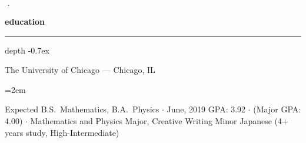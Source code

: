 \documentclass[12pt]{scrartcl}
\newcommand{\Description}[1]{\hangindent=2em\hangafter=0\noindent\raggedright\footnotesize{#1}\par\normalsize\vspace{0.5em}} %
\def\vhrulefill{\leavevmode\leaders\hrule height 0.7ex depth \dimexpr0.4pt-0.7ex\hfill\kern0pt}
\begin{document}
\date{}

\thispagestyle{empty} %



\begin{cv}{ $\,\cdot\,$ \virgo}\vspace{1.5em} %


\noindent
\begin{minipage}[t]{.6\textwidth}

\noindent\textbf{education} \hspace{1ex} \vhrulefill \vspace{0.5em} 

{\footnotesize\noindent
The University of Chicago --- Chicago, IL}

\Description{Expected B.S.\ Mathematics, B.A.\ Physics $\cdotp$ June, 2019\newline
GPA: 3.92 $\cdotp$ (Major GPA: 4.00) $\cdotp$ Mathematics and Physics Major, Creative Writing Minor\newline
Japanese (4+ years study, High-Intermediate)
}



\end{minipage}\hspace{1em}%
\begin{minipage}[t]{.35\textwidth}


\end{minipage}
\end{cv}
\end{document}
